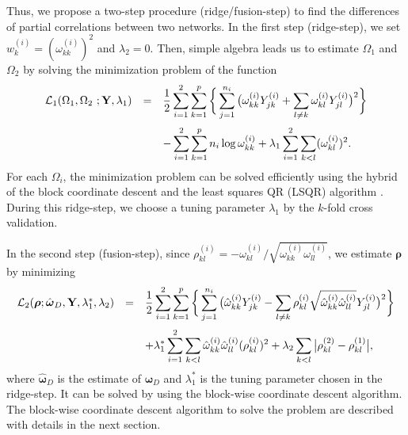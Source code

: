 \documentclass[useAMS,usenatbib,referee]{bio}
\newcommand{\bs}{\boldsymbol}
\begin{document}
{{Thus, we propose a two-step procedure (ridge/fusion-step) to find the differences of partial correlations between two networks.
In the first step (ridge-step), we set $w_k^{(i)}=(\omega_{kk}^{(i)})^2$ and $\lambda_2=0$. 
Then, simple algebra leads us to estimate $\Omega_1$ and $\Omega_2$ by solving the minimization problem of the function 
\begin{equation} \label{eqn:obj1}
\begin{array}{lll}  \medskip
{\mathcal L}_1(\Omega_1,\Omega_2~;\mathbf{Y},\lambda_1) &=& \displaystyle
 \frac{1}{2} \sum_{i=1}^2 \sum_{k=1}^p \bigg\{ \sum_{j=1}^{n_i} \big(\omega^{(i)}_{kk}Y_{jk}^{(i)} +  \sum_{l \neq k} \omega^{(i)}_{kl} Y_{jl}^{(i)} \big)^2 \bigg\}  \\
&& \displaystyle 
 -\sum_{i=1}^2 \sum_{k=1}^p {n_i} \log \omega^{(i)}_{kk} 
+ \lambda_1 \sum_{i=1}^2 \sum_{k<l} (\omega^{(i)}_{kl})^2.
\end{array}
\end{equation}
For each $\Omega_i$, the minimization problem can be solved efficiently using the hybrid of the block coordinate descent \citep{Khare2014} and the least squares QR (LSQR) algorithm \citep{Paige:1982}. 
During this ridge-step, we choose a tuning parameter $\lambda_1$ by the $k$-fold cross validation. 

In the second step (fusion-step), since $\rho_{kl}^{(i)}=-\omega_{kl}^{(i)}/\sqrt{\omega_{kk}^{(i)} \omega_{ll}^{(i)}}$, we estimate $\bs{\rho}$ by minimizing
\begin{equation} \label{eqn:obj2}
\begin{array}{lll}  \medskip
{\mathcal L}_2(\bs{\rho};\hat{\bs{\omega}}_D,\mathbf{Y},\lambda_1^*,\lambda_2) &=& \displaystyle
 \frac{1}{2} \sum_{i=1}^2 \sum_{k=1}^p \bigg\{ \sum_{j=1}^{n_i} \big(\hat{\omega}^{(i)}_{kk} Y_{jk}^{(i)} -  \sum_{l \neq k} \rho^{(i)}_{kl} \sqrt{\hat{\omega}^{(i)}_{kk} \hat{\omega}^{(i)}_{ll}}  Y_{jl}^{(i)} \big)^2 \bigg\}  \\
&& \displaystyle 
+ \lambda_1^* \sum_{i=1}^2 \sum_{k<l} \hat{\omega}^{(i)}_{kk} \hat{\omega}^{(i)}_{ll} (\rho^{(i)}_{kl})^2  + \lambda_2 \sum_{k<l} \big| \rho^{(2)}_{kl} - \rho^{(1)}_{kl} \big|,
\end{array} \medskip
\end{equation}
where  $\hat{\bs{\omega}}_D$ is the estimate of $\bs{\omega}_D$ and $\lambda_1^*$ is the tuning parameter chosen in the ridge-step. 
It can be solved by using the block-wise coordinate descent algorithm.
The block-wise coordinate descent algorithm to solve the problem are described with details in the next section.

}}
\end{document}
